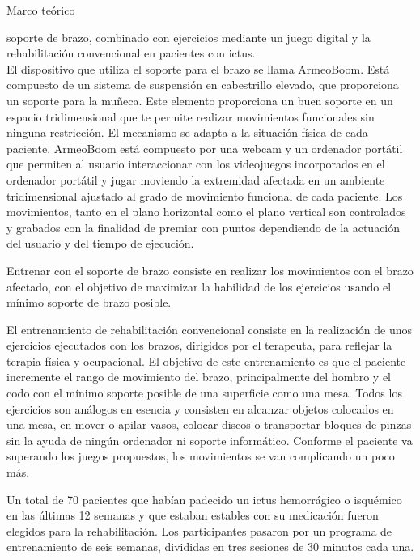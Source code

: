\begin{thesischapter}{1} {Marco teórico}
\begin{itemize}
        soporte de brazo, combinado con ejercicios mediante un juego digital y la rehabilitación
        convencional en pacientes con ictus.\\
        El dispositivo que utiliza el soporte para el brazo se llama ArmeoBoom. Está compuesto de
        un sistema de suspensión en cabestrillo elevado, que proporciona un soporte para la
        muñeca. Este elemento proporciona un buen soporte en un espacio tridimensional
        que te permite realizar movimientos funcionales sin ninguna restricción. El mecanismo se
        adapta a la situación física de cada paciente. ArmeoBoom está compuesto por una webcam
        y un ordenador portátil que permiten al usuario interaccionar con los videojuegos
        incorporados en el ordenador portátil y jugar moviendo la extremidad afectada en un
        ambiente tridimensional ajustado al grado de movimiento funcional de cada paciente.
        Los movimientos, tanto en el plano horizontal como el plano vertical son controlados y
        grabados con la finalidad de premiar con puntos dependiendo de la actuación del usuario
        y del tiempo de ejecución.
        
        \vspace{2pt}
        Entrenar con el soporte de brazo consiste en realizar los movimientos con el brazo
        afectado, con el objetivo de maximizar la habilidad de los ejercicios usando el mínimo
        soporte de brazo posible.
        
        \vspace{2pt}
        El entrenamiento de rehabilitación convencional consiste en la realización de unos
        ejercicios ejecutados con los brazos, dirigidos por el terapeuta, para reflejar la terapia física
        y ocupacional.
        El objetivo de este entrenamiento es que el paciente incremente el rango de movimiento
        del brazo, principalmente del hombro y el codo con el mínimo soporte posible de una
        superficie como una mesa. Todos los ejercicios son análogos en esencia y consisten en alcanzar 
        objetos colocados en una mesa, en mover o apilar vasos, colocar discos o transportar bloques de 
        pinzas sin la ayuda de ningún ordenador ni soporte informático. Conforme el paciente va superando los juegos
        propuestos, los movimientos se van complicando un poco más.

        \vspace{2pt}
        Un total de 70 pacientes que habían padecido un ictus hemorrágico o isquémico en las
        últimas 12 semanas y que estaban estables con su medicación fueron elegidos para la
        rehabilitación. Los participantes pasaron por un programa de entrenamiento de seis
        semanas, divididas en tres sesiones de 30 minutos cada una.
        

\end{itemize}
\end{thesischapter}

